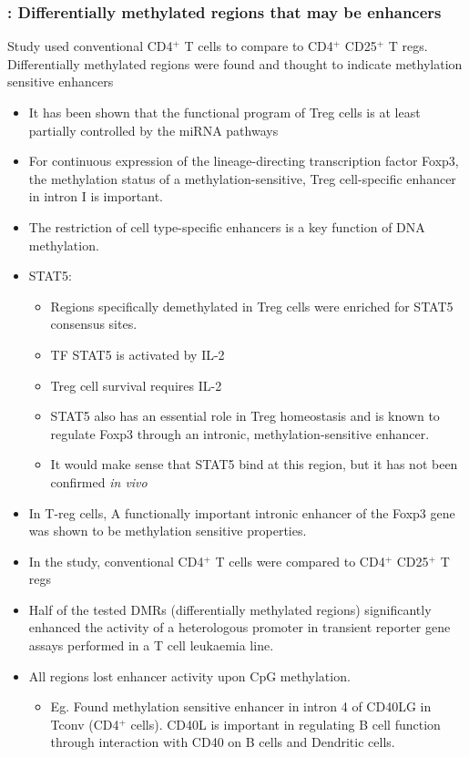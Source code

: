 \documentclass[12pt]{article}
\begin{document}
			\subsubsection{\citeauthor{Schmidl09} \citeyear{Schmidl09}: Differentially methylated regions that may be enhancers}
				
				Study used conventional CD4$^+$ T cells to compare to CD4$^+$ CD25$^+$ T regs. Differentially methylated regions were found and thought to indicate methylation sensitive enhancers
				
				\begin{itemize}
					\item It has been shown that the functional program of Treg cells is at least partially controlled by the miRNA pathways 
					\item For continuous expression of the lineage-directing transcription factor Foxp3, the methylation status of a methylation-sensitive, Treg cell-specific enhancer in intron I is important.
					\item The restriction of cell type-specific enhancers is a key function of DNA methylation. 
					\item STAT5:
					\begin{itemize}
						\item Regions specifically demethylated in Treg cells were enriched for STAT5 consensus sites. 
						\item TF STAT5 is activated by IL-2
						\item Treg cell survival requires IL-2
						\item STAT5 also has an essential role in Treg homeostasis and is known to regulate Foxp3 through an intronic, methylation-sensitive enhancer. 
						\item It would make sense that STAT5 bind at this region, but it has not been confirmed \textit{in vivo}
					\end{itemize}
					\item In T-reg cells, A functionally important intronic enhancer of the Foxp3 gene was shown to be methylation sensitive properties.
					\item In the study, conventional CD4$^+$ T cells were compared to CD4$^+$ CD25$^+$ T regs
					\item Half of the tested DMRs (differentially methylated regions) significantly enhanced the activity of a heterologous promoter in transient reporter gene assays performed in a T cell leukaemia line.
					\item All regions lost enhancer activity upon CpG methylation.
					\begin{itemize}
						\item Eg. Found methylation sensitive enhancer in intron 4 of CD40LG in Tconv (CD4$^+$ cells). CD40L is important in regulating B cell function through interaction with CD40 on B cells and Dendritic cells.
					\end{itemize} 
				\end{itemize}
	
\end{document}
